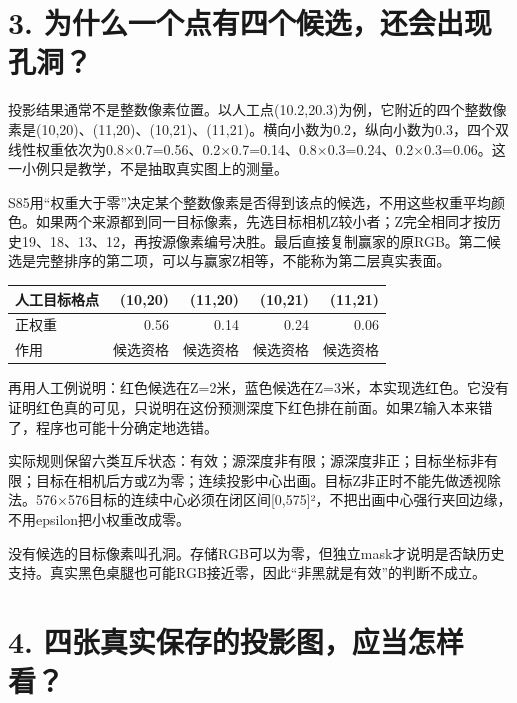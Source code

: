 \documentclass[UTF8,11pt,a4paper]{ctexart}
\begin{document}
\clearpage

\section*{3. 为什么一个点有四个候选，还会出现孔洞？}

投影结果通常不是整数像素位置。以人工点(10.2,20.3)为例，它附近的四个整数像素是(10,20)、(11,20)、(10,21)、(11,21)。横向小数为0.2，纵向小数为0.3，四个双线性权重依次为0.8×0.7=0.56、0.2×0.7=0.14、0.8×0.3=0.24、0.2×0.3=0.06。这一小例只是教学，不是抽取真实图上的测量。
\par


S85用“权重大于零”决定某个整数像素是否得到该点的候选，不用这些权重平均颜色。如果两个来源都到同一目标像素，先选目标相机Z较小者；Z完全相同才按历史19、18、13、12，再按源像素编号决胜。最后直接复制赢家的原RGB。第二候选是完整排序的第二项，可以与赢家Z相等，不能称为第二层真实表面。
\par


\begin{center}\small
    \begin{tabular}{lrrrr}\toprule
    人工目标格点&(10,20)&(11,20)&(10,21)&(11,21)\\\midrule
    正权重&0.56&0.14&0.24&0.06\\
    作用&候选资格&候选资格&候选资格&候选资格\\\bottomrule
    \end{tabular}\end{center}

再用人工例说明：红色候选在Z=2米，蓝色候选在Z=3米，本实现选红色。它没有证明红色真的可见，只说明在这份预测深度下红色排在前面。如果Z输入本来错了，程序也可能十分确定地选错。
\par


实际规则保留六类互斥状态：有效；源深度非有限；源深度非正；目标坐标非有限；目标在相机后方或Z为零；连续投影中心出画。目标Z非正时不能先做透视除法。576×576目标的连续中心必须在闭区间[0,575]²，不把出画中心强行夹回边缘，不用epsilon把小权重改成零。
\par


没有候选的目标像素叫孔洞。存储RGB可以为零，但独立mask才说明是否缺历史支持。真实黑色桌腿也可能RGB接近零，因此“非黑就是有效”的判断不成立。
\par


\clearpage

\section*{4. 四张真实保存的投影图，应当怎样看？}
\end{document}
